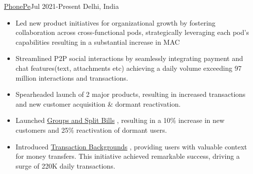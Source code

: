 \documentclass[10pt,a4paper,ragged2e]{altacv}
\begin{document}
 {\color{mecol}\href{https://www.phonepe.com/}{PhonePe}}{Jul 2021-Present }{Delhi, India}
\begin{itemize}


\item {Led new product initiatives for organizational growth by fostering collaboration across cross-functional pods, strategically leveraging each pod's capabilities resulting in a substantial increase in MAC}
\item {Streamlined P2P social interactions by seamlessly integrating payment and chat features(text, attachments etc) achieving a daily volume exceeding 97 million interactions and transactions. }
\item {Spearheaded launch of 2 major products, resulting in increased transactions and new customer acquisition \& dormant reactivation.}
\item {Launched \href{https://www.phonepe.com/blog/design/phonepes-split-expenses-streamlining-group-transactions-with-ease/}{Groups and Split Bills} , resulting in a 10\% increase in new customers and 25\% reactivation of dormant users.  }
\item { Introduced \href{https://www.instagram.com/s/aGlnaGxpZ2h0OjE3OTA3NTEwMjY4NzE2NDQ5?story_media_id=2931443902160263738&igsh=ejYyejBzODgxeXll}{Transaction Backgrounds} , providing users with valuable context for money transfers. This initiative achieved remarkable success, driving a surge of 220K daily transactions. }




\end{itemize}
\divider
\end{document}
